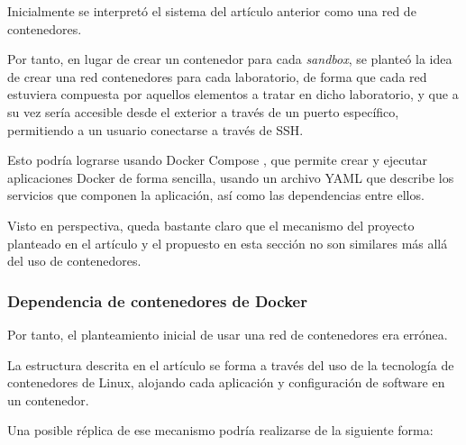                 Inicialmente se interpretó el sistema del artículo anterior como una red de contenedores.
                
                Por tanto, en lugar de crear un contenedor para cada \textit{sandbox}, se planteó la idea de crear una red contenedores para cada laboratorio, de forma que cada red estuviera compuesta por aquellos elementos a tratar en dicho laboratorio, y que a su vez sería accesible desde el exterior a través de un puerto específico, permitiendo a un usuario conectarse a través de SSH.

                Esto podría lograrse usando Docker Compose \cite{docker-compose}, que permite crear y ejecutar aplicaciones Docker de forma sencilla, usando un archivo YAML que describe los servicios que componen la aplicación, así como las dependencias entre ellos.

                Visto en perspectiva, queda bastante claro que el mecanismo del proyecto planteado en el artículo y el propuesto en esta sección no son similares más allá del uso de contenedores.
                
                
            \subsubsection{Dependencia de contenedores de Docker}

                Por tanto, el planteamiento inicial de usar una red de contenedores era errónea.
                
                La estructura descrita en el artículo se forma a través del uso de la tecnología de contenedores de Linux, alojando cada aplicación y configuración de software en un contenedor.

                Una posible réplica de ese mecanismo podría realizarse de la siguiente forma:

